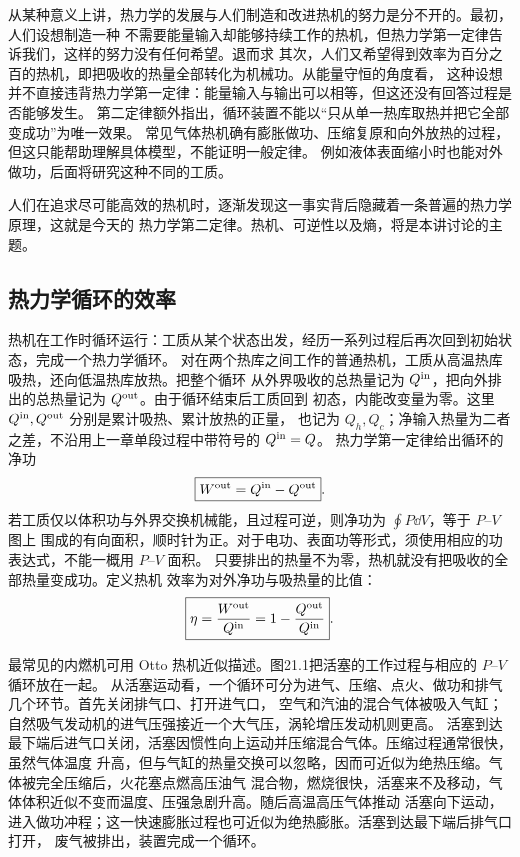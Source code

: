 从某种意义上讲，热力学的发展与人们制造和改进热机的努力是分不开的。最初，人们设想制造一种
不需要能量输入却能够持续工作的热机，但热力学第一定律告诉我们，这样的努力没有任何希望。退而求
其次，人们又希望得到效率为百分之百的热机，即把吸收的热量全部转化为机械功。从能量守恒的角度看，
这种设想并不直接违背热力学第一定律：能量输入与输出可以相等，但这还没有回答过程是否能够发生。
第二定律额外指出，循环装置不能以“只从单一热库取热并把它全部变成功”为唯一效果。
常见气体热机确有膨胀做功、压缩复原和向外放热的过程，但这只能帮助理解具体模型，不能证明一般定律。
例如液体表面缩小时也能对外做功，后面将研究这种不同的工质。

人们在追求尽可能高效的热机时，逐渐发现这一事实背后隐藏着一条普遍的热力学原理，这就是今天的
热力学第二定律。热机、可逆性以及熵，将是本讲讨论的主题。

\subsection*{热力学循环的效率}

热机在工作时循环运行：工质从某个状态出发，经历一系列过程后再次回到初始状态，完成一个热力学循环。
对在两个热库之间工作的普通热机，工质从高温热库吸热，还向低温热库放热。把整个循环
从外界吸收的总热量记为 $Q^{\rm in}$，把向外排出的总热量记为 $Q^{\rm out}$。由于循环结束后工质回到
初态，内能改变量为零。这里 $Q^{\rm in},Q^{\rm out}$ 分别是累计吸热、累计放热的正量，
也记为 $Q_h,Q_c$；净输入热量为二者之差，不沿用上一章单段过程中带符号的 $Q^{\rm in}=Q$。
热力学第一定律给出循环的净功
\begin{equation}
  \boxed{W^{\rm out}=Q^{\rm in}-Q^{\rm out}}.
\end{equation}
若工质仅以体积功与外界交换机械能，且过程可逆，则净功为 $\oint P\dd V$，等于 $P$--$V$ 图上
围成的有向面积，顺时针为正。对于电功、表面功等形式，须使用相应的功表达式，不能一概用 $P$--$V$ 面积。
只要排出的热量不为零，热机就没有把吸收的全部热量变成功。定义热机
效率为对外净功与吸热量的比值：
\begin{equation}
  \boxed{\eta=\frac{W^{\rm out}}{Q^{\rm in}}
  =1-\frac{Q^{\rm out}}{Q^{\rm in}}}.
\end{equation}

最常见的内燃机可用 Otto 热机近似描述。图21.1把活塞的工作过程与相应的 $P$--$V$ 循环放在一起。
从活塞运动看，一个循环可分为进气、压缩、点火、做功和排气几个环节。首先关闭排气口、打开进气口，
空气和汽油的混合气体被吸入气缸；自然吸气发动机的进气压强接近一个大气压，涡轮增压发动机则更高。
活塞到达最下端后进气口关闭，活塞因惯性向上运动并压缩混合气体。压缩过程通常很快，虽然气体温度
升高，但与气缸的热量交换可以忽略，因而可近似为绝热压缩。气体被完全压缩后，火花塞点燃高压油气
混合物，燃烧很快，活塞来不及移动，气体体积近似不变而温度、压强急剧升高。随后高温高压气体推动
活塞向下运动，进入做功冲程；这一快速膨胀过程也可近似为绝热膨胀。活塞到达最下端后排气口打开，
废气被排出，装置完成一个循环。

